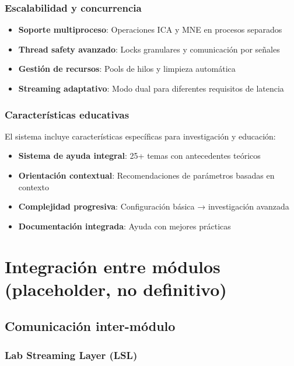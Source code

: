 \subsubsection{Escalabilidad y concurrencia}

\begin{itemize}
    \item \textbf{Soporte multiproceso}: Operaciones ICA y MNE en procesos separados
    \item \textbf{Thread safety avanzado}: Locks granulares y comunicación por señales
    \item \textbf{Gestión de recursos}: Pools de hilos y limpieza automática
    \item \textbf{Streaming adaptativo}: Modo dual para diferentes requisitos de latencia
\end{itemize}

\subsubsection{Características educativas}

El sistema incluye características específicas para investigación y educación:
\begin{itemize}
    \item \textbf{Sistema de ayuda integral}: 25+ temas con antecedentes teóricos
    \item \textbf{Orientación contextual}: Recomendaciones de parámetros basadas en contexto
    \item \textbf{Complejidad progresiva}: Configuración básica → investigación avanzada
    \item \textbf{Documentación integrada}: Ayuda con mejores prácticas
\end{itemize}

\section{Integración entre módulos (placeholder, no definitivo)}
\label{sec:integracion_modulos}

\subsection{Comunicación inter-módulo}
\label{subsec:comunicacion_inter_modulo}

\subsubsection{Lab Streaming Layer (LSL)}

